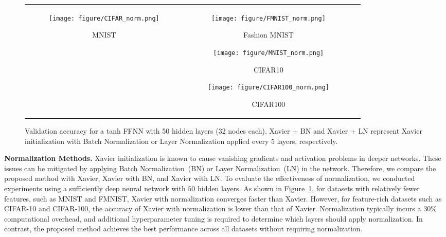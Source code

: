 \documentclass{article} \usepackage{iclr2025_conference,times}
\begin{document}
\begin{figure}[h!]
\centering 
\begin{tabular}{ccc}
\begin{subfigure}[b]{0.24\textwidth}
    \centering
    \texttt{[image: figure/CIFAR\_norm.png]}
    \caption{MNIST}
\end{subfigure} &
\begin{subfigure}[b]{0.24\textwidth}
    \centering
    \texttt{[image: figure/FMNIST\_norm.png]}
    \caption{Fashion MNIST}
\end{subfigure} 
\begin{subfigure}[b]{0.24\textwidth}
    \centering
    \texttt{[image: figure/MNIST\_norm.png]}
    \caption{CIFAR10}
\end{subfigure}
\begin{subfigure}[b]{0.24\textwidth}
    \centering
    \texttt{[image: figure/CIFAR100\_norm.png]}
    \caption{CIFAR100}
\end{subfigure}

\end{tabular}
\caption{Validation accuracy for a tanh FFNN with 50 hidden layers (32 nodes each). Xavier + BN and Xavier + LN represent Xavier initialization with Batch Normalization or Layer Normalization applied every 5 layers, respectively.} 
\label{norm_100epoch}
\end{figure}

\textbf{Normalization Methods.} Xavier initialization is known to cause vanishing gradients and activation problems in deeper networks. These issues can be mitigated by applying Batch Normalization~(BN) or Layer Normalization~(LN) in the network. Therefore, we compare the proposed method with Xavier, Xavier with BN, and Xavier with LN. 
To evaluate the effectiveness of normalization, we conducted experiments using a sufficiently deep neural network with $50$ hidden layers. As shown in Figure~\ref{norm_100epoch}, for datasets with relatively fewer features, such as MNIST and FMNIST, Xavier with normalization converges faster than Xavier. However, for feature-rich datasets such as CIFAR-10 and CIFAR-100, the accuracy of Xavier with normalization is lower than that of Xavier. Normalization typically incurs a $30\%$ computational overhead, and additional hyperparameter tuning is required to determine which layers should apply normalization. In contrast, the proposed method achieves the best performance across all datasets without requiring normalization.
\end{document}
